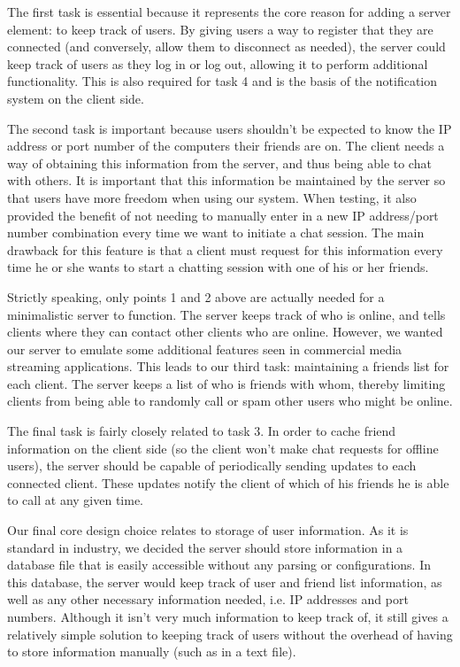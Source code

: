 The first task is essential because it represents the core reason for adding a
server element: to keep track of users. By giving users a way to register that
they are connected (and conversely, allow them to disconnect as needed), the
server could keep track of users as they log in or log out, allowing it to
perform additional functionality. This is also required for task 4 and is the
basis of the notification system on the client side.

The second task is important because users shouldn't be expected to know the IP
address or port number of the computers their friends are on. The client needs a
way of obtaining this information from the server, and thus being able to chat
with others. It is important that this information be maintained by the server
so that users have more freedom when using our system. When testing, it also
provided the benefit of not needing to manually enter in a new IP address/port
number combination every time we want to initiate a chat session. The main
drawback for this feature is that a client must request for this information
every time he or she wants to start a chatting session with one of his or her
friends.

Strictly speaking, only points 1 and 2 above are actually needed for a
minimalistic server to function. The server keeps track of who is online, and
tells clients where they can contact other clients who are online. However, we
wanted our server to emulate some additional features seen in commercial media
streaming applications. This leads to our third task: maintaining a friends list
for each client.
The server keeps a list of who is friends with whom, thereby limiting clients from being able to randomly call or spam other users who might be online.

The final task is fairly closely related to task 3. In order to cache friend
information on the client side (so the client won't make chat requests for
offline users), the server should be capable of periodically sending updates to
each connected client. These updates notify the client of which of his friends
he is able to call at any given time.

Our final core design choice relates to storage of user information. As it is
standard in industry, we decided the server should store information in a
database file that is easily accessible without any parsing or configurations.
In this database, the server would keep track of user and friend list
information, as well as any other necessary information needed, i.e. IP
addresses and port numbers. Although it isn't very much information to keep
track of, it still gives a relatively simple solution to keeping track of users
without the overhead of having to store information manually (such as in a text
file).
 
